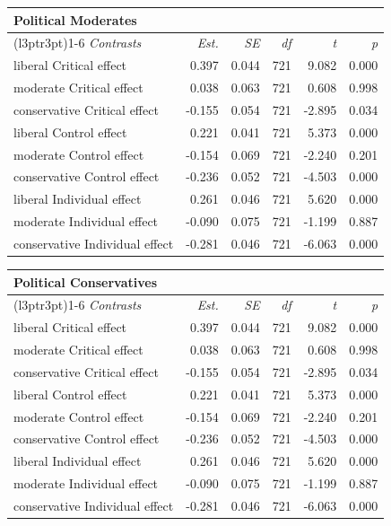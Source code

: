 \documentclass[
]{book}
\begin{document}
\begin{table}
\centering
\fontsize{13}{15}\selectfont
\begin{tabular}{lrrrrr}
\toprule
\multicolumn{6}{l}{Political Moderates} \\
\cmidrule(l{3pt}r{3pt}){1-6}
\em{Contrasts} & \em{Est.} & \em{SE} & \em{df} & \em{t} & \em{p}\\
\midrule
liberal Critical effect & 0.397 & 0.044 & 721 & 9.082 & 0.000\\
moderate Critical effect & 0.038 & 0.063 & 721 & 0.608 & 0.998\\
conservative Critical effect & -0.155 & 0.054 & 721 & -2.895 & 0.034\\
liberal Control effect & 0.221 & 0.041 & 721 & 5.373 & 0.000\\
moderate Control effect & -0.154 & 0.069 & 721 & -2.240 & 0.201\\
\addlinespace
conservative Control effect & -0.236 & 0.052 & 721 & -4.503 & 0.000\\
liberal Individual effect & 0.261 & 0.046 & 721 & 5.620 & 0.000\\
moderate Individual effect & -0.090 & 0.075 & 721 & -1.199 & 0.887\\
conservative Individual effect & -0.281 & 0.046 & 721 & -6.063 & 0.000\\
\bottomrule
\end{tabular}
\end{table}

\begin{table}
\centering
\fontsize{13}{15}\selectfont
\begin{tabular}{lrrrrr}
\toprule
\multicolumn{6}{l}{Political Conservatives} \\
\cmidrule(l{3pt}r{3pt}){1-6}
\em{Contrasts} & \em{Est.} & \em{SE} & \em{df} & \em{t} & \em{p}\\
\midrule
liberal Critical effect & 0.397 & 0.044 & 721 & 9.082 & 0.000\\
moderate Critical effect & 0.038 & 0.063 & 721 & 0.608 & 0.998\\
conservative Critical effect & -0.155 & 0.054 & 721 & -2.895 & 0.034\\
liberal Control effect & 0.221 & 0.041 & 721 & 5.373 & 0.000\\
moderate Control effect & -0.154 & 0.069 & 721 & -2.240 & 0.201\\
\addlinespace
conservative Control effect & -0.236 & 0.052 & 721 & -4.503 & 0.000\\
liberal Individual effect & 0.261 & 0.046 & 721 & 5.620 & 0.000\\
moderate Individual effect & -0.090 & 0.075 & 721 & -1.199 & 0.887\\
conservative Individual effect & -0.281 & 0.046 & 721 & -6.063 & 0.000\\
\bottomrule
\end{tabular}
\end{table}
\end{document}
